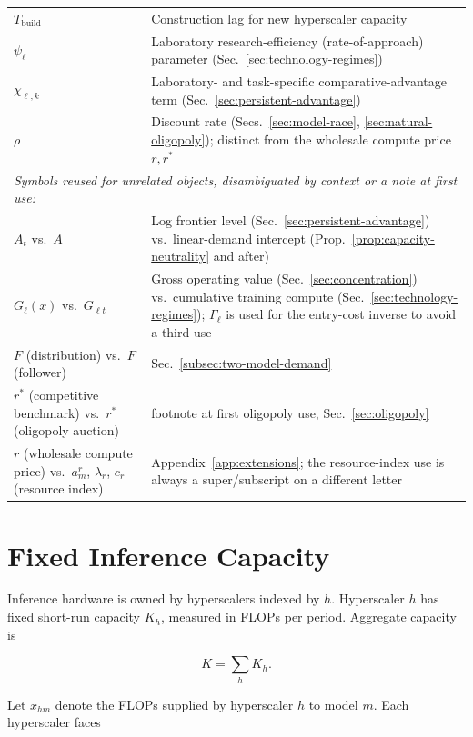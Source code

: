 \documentclass[11pt]{article}
\begin{document}
\begin{table}[htbp]
\begin{tabular}{l>{\raggedright\arraybackslash}p{4.4in}}
$T_{\mathrm{build}}$ & Construction lag for new hyperscaler capacity \\
$\psi_\ell$ & Laboratory research-efficiency (rate-of-approach) parameter (Sec.~\ref{sec:technology-regimes}) \\
$\chi_{\ell,k}$ & Laboratory- and task-specific comparative-advantage term (Sec.~\ref{sec:persistent-advantage}) \\
$\rho$ & Discount rate (Secs.~\ref{sec:model-race}, \ref{sec:natural-oligopoly}); distinct from the wholesale compute price $r,r^*$ \\
\hline
\multicolumn{2}{l}{\emph{Symbols reused for unrelated objects, disambiguated by context or a note at first use:}} \\
$A_t$ vs.\ $A$ & Log frontier level (Sec.~\ref{sec:persistent-advantage}) vs.\ linear-demand intercept (Prop.~\ref{prop:capacity-neutrality} and after) \\
$G_\ell(x)$ vs.\ $G_{\ell t}$ & Gross operating value (Sec.~\ref{sec:concentration}) vs.\ cumulative training compute (Sec.~\ref{sec:technology-regimes}); $\Gamma_\ell$ is used for the entry-cost inverse to avoid a third use \\
$F$ (distribution) vs.\ $F$ (follower) & Sec.~\ref{subsec:two-model-demand} \\
$r^*$ (competitive benchmark) vs.\ $r^*$ (oligopoly auction) & footnote at first oligopoly use, Sec.~\ref{sec:oligopoly} \\
$r$ (wholesale compute price) vs.\ $a_m^r$, $\lambda_r$, $c_r$ (resource index) & Appendix~\ref{app:extensions}; the resource-index use is always a super/subscript on a different letter \\
\hline
\end{tabular}
\end{table}

\section{Fixed Inference Capacity}
\label{sec:fixed-capacity}

Inference hardware is owned by hyperscalers indexed by $h$. Hyperscaler $h$ has fixed short-run capacity $K_h$, measured in FLOPs per period. Aggregate capacity is

\begin{equation}K=\sum_h K_h.\end{equation}

Let $x_{hm}$ denote the FLOPs supplied by hyperscaler $h$ to model $m$. Each hyperscaler faces
\end{document}
